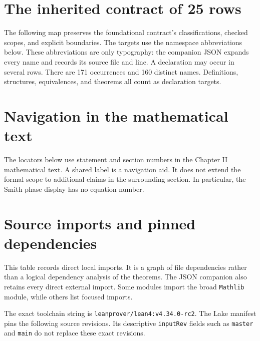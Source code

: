 \documentclass[11pt,a4paper]{article}
\newcommand{\code}[1]{\nolinkurl{#1}}
\begin{document}
\KomorebiCover
{}


\tableofcontents
\clearpage
{}

\clearpage

\clearpage






\clearpage
\section{The inherited contract of 25 rows}\label{sec:map}
The following map preserves the foundational contract's classifications, checked scopes, and explicit boundaries. The targets use the namespace abbreviations below. These abbreviations are only typography: the companion JSON expands every name and records its source file and line. A declaration may occur in several rows. There are 171 occurrences and 160 distinct names. Definitions, structures, equivalences, and theorems all count as declaration targets.


\clearpage
\appendix
\section{Navigation in the mathematical text}\label{app:crosswalk}
The locators below use statement and section numbers in the Chapter II mathematical text. A shared label is a navigation aid. It does not extend the formal scope to additional claims in the surrounding section. In particular, the Smith phase display has no equation number.

\section{Source imports and pinned dependencies}\label{app:imports}
This table records direct local imports. It is a graph of file dependencies rather than a logical dependency analysis of the theorems. The JSON companion also retains every direct external import. Some modules import the broad \code{Mathlib} module, while others list focused imports.

The exact toolchain string is \code{leanprover/lean4:v4.34.0-rc2}. The Lake manifest pins the following source revisions. Its descriptive \code{inputRev} fields such as \code{master} and \code{main} do not replace these exact revisions.

\end{document}
